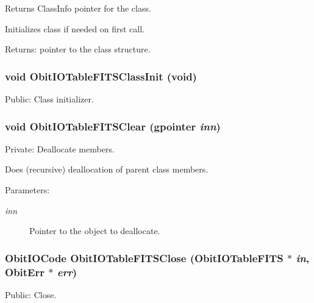 Returns Class\-Info pointer for the class. 

Initializes class if needed on first call. \begin{Desc}
\item[Returns:]pointer to the class structure. \end{Desc}
\subsubsection{\setlength{\rightskip}{0pt plus 5cm}void Obit\-IOTable\-FITSClass\-Init (void)}\label{ObitIOTableFITS_8c_a32}


Public: Class initializer. 

\subsubsection{\setlength{\rightskip}{0pt plus 5cm}void Obit\-IOTable\-FITSClear (gpointer {\em inn})}\label{ObitIOTableFITS_8c_a5}


Private: Deallocate members. 

Does (recursive) deallocation of parent class members. \begin{Desc}
\item[Parameters:]
\begin{description}
\item[{\em inn}]Pointer to the object to deallocate. \end{description}
\end{Desc}
\subsubsection{\setlength{\rightskip}{0pt plus 5cm}Obit\-IOCode Obit\-IOTable\-FITSClose ({\bf Obit\-IOTable\-FITS} $\ast$ {\em in}, {\bf Obit\-Err} $\ast$ {\em err})}\label{ObitIOTableFITS_8c_a19}


Public: Close. 

